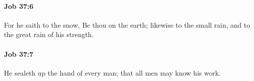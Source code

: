 		\paragraph{Job 37:6} %
			\label{JOB-37-6}

			For he saith to the snow, Be thou on the earth; likewise to the small rain, and to the great rain of his strength.


		\paragraph{Job 37:7} %
			\label{JOB-37-7}

			He sealeth up the hand of every man; that all men may know his work.


